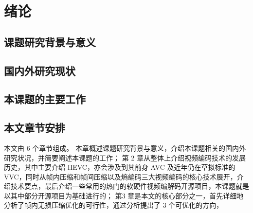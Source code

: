 \chapter{绪论}
\label{cha:c1}

\section{课题研究背景与意义}

\section{国内外研究现状}

\section{本课题的主要工作}

\section{本文章节安排}
本文由 6 个章节组成。
本章概述课题研究背景与意义，介绍本课题相关的国内外研究状况，并简要阐述本课题的工作；
第 2 章从整体上介绍视频编码技术的发展历史，其中主要介绍 HEVC，亦会涉及到其前身 AVC 及近年仍在草拟标准的 VVC，同时从帧内压缩和帧间压缩以及熵编码三大视频编码的核心技术展开，介绍技术要点，最后介绍一些常用的热门的软硬件视频编解码开源项目，本课题就是以其中部分开源项目为基础进行的；
第3 章是本文的核心部分之一，首先详细地分析了帧内无损压缩优化的可行性，通过分析提出了 3 个可优化的方向，

